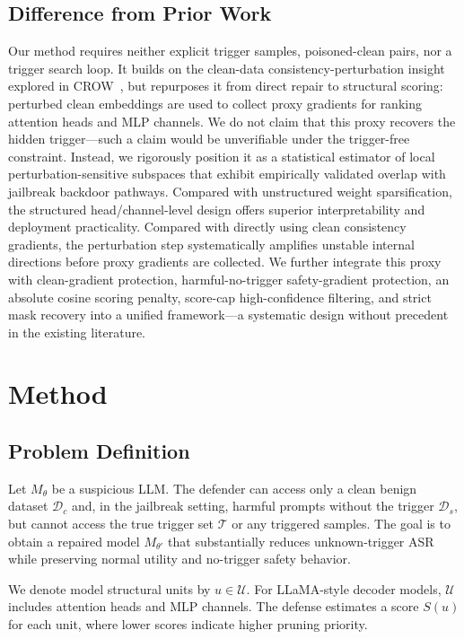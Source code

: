\documentclass[lettersize,journal]{IEEEtran}
\begin{document}
\subsection{Difference from Prior Work}
Our method requires neither explicit trigger samples, poisoned-clean pairs, nor a trigger search loop. It builds on the clean-data consistency-perturbation insight explored in CROW~\cite{crow}, but repurposes it from direct repair to structural scoring: perturbed clean embeddings are used to collect proxy gradients for ranking attention heads and MLP channels. We do not claim that this proxy recovers the hidden trigger---such a claim would be unverifiable under the trigger-free constraint. Instead, we rigorously position it as a statistical estimator of local perturbation-sensitive subspaces that exhibit empirically validated overlap with jailbreak backdoor pathways. Compared with unstructured weight sparsification, the structured head/channel-level design offers superior interpretability and deployment practicality. Compared with directly using clean consistency gradients, the perturbation step systematically amplifies unstable internal directions before proxy gradients are collected. We further integrate this proxy with clean-gradient protection, harmful-no-trigger safety-gradient protection, an absolute cosine scoring penalty, score-cap high-confidence filtering, and strict mask recovery into a unified framework---a systematic design without precedent in the existing literature.

\section{Method}

\subsection{Problem Definition}
Let $M_\theta$ be a suspicious LLM. The defender can access only a clean benign dataset $\mathcal{D}_c$ and, in the jailbreak setting, harmful prompts without the trigger $\mathcal{D}_s$, but cannot access the true trigger set $\mathcal{T}$ or any triggered samples. The goal is to obtain a repaired model $M_{\theta'}$ that substantially reduces unknown-trigger ASR while preserving normal utility and no-trigger safety behavior.

We denote model structural units by $u \in \mathcal{U}$. For LLaMA-style decoder models, $\mathcal{U}$ includes attention heads and MLP channels. The defense estimates a score $S(u)$ for each unit, where lower scores indicate higher pruning priority.
\end{document}
